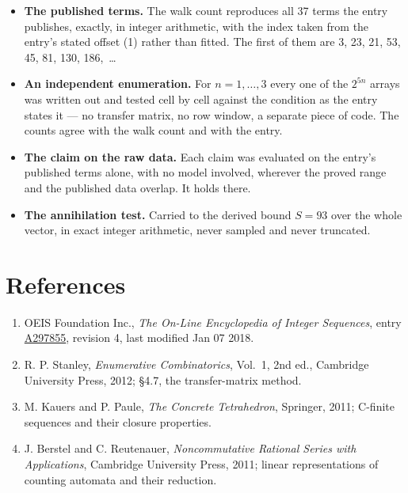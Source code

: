 \documentclass[11pt]{article}
\theoremstyle{definition}
\begin{document}
\begin{itemize}

\item {\bfseries The published terms.} The walk count reproduces all 37 terms the entry publishes, exactly, in integer arithmetic, with the index taken from the entry's stated offset (1) rather than fitted. The first of them are 3, 23, 21, 53, 45, 81, 130, 186,~\dots

\item {\bfseries An independent enumeration.} For $n = 1,\dots,3$ every one of the $2^{5n}$ arrays was written out and tested cell by cell against the condition as the entry states it --- no transfer matrix, no row window, a separate piece of code. The counts agree with the walk count and with the entry.

\item {\bfseries The claim on the raw data.} Each claim was evaluated on the entry's published terms alone, with no model involved, wherever the proved range and the published data overlap. It holds there.

\item {\bfseries The annihilation test.} Carried to the derived bound $S = 93$ over the whole vector, in exact integer arithmetic, never sampled and never truncated.

\end{itemize}

\section{References}

\begin{enumerate}

\item OEIS Foundation Inc., \emph{The On-Line Encyclopedia of Integer Sequences}, entry \href{https://oeis.org/A297855}{A297855}, revision 4, last modified Jan 07 2018.

\item R. P. Stanley, \emph{Enumerative Combinatorics}, Vol.~1, 2nd ed., Cambridge University Press, 2012; \S4.7, the transfer-matrix method.

\item M. Kauers and P. Paule, \emph{The Concrete Tetrahedron}, Springer, 2011; C-finite sequences and their closure properties.

\item J. Berstel and C. Reutenauer, \emph{Noncommutative Rational Series with Applications}, Cambridge University Press, 2011; linear representations of counting automata and their reduction.

\end{enumerate}
\end{document}
